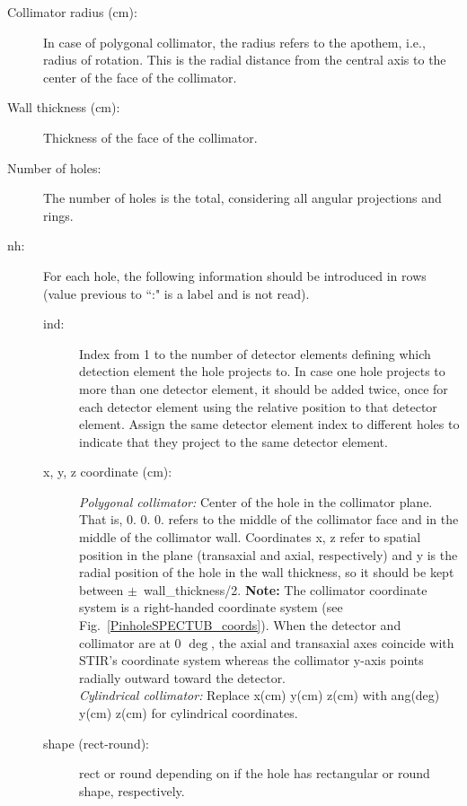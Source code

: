 \documentclass{article}
\begin{document}
{{{{{{\begin{description}
\item[Collimator radius (cm):] In case of polygonal collimator, the radius refers to the apothem, i.e., radius of rotation. This is the radial distance from the central axis to the center of the face of the collimator.

\item[Wall thickness (cm):] Thickness of the face of the collimator.

\item[Number of holes:] The number of holes is the total, considering all angular projections and rings. 

\item[nh:] For each hole, the following information should be introduced in rows (value previous to ``:" is a label and is not read).

\begin{description}

\item[ind:] Index from 1 to the number of detector elements defining which detection element the hole projects to. In case one hole projects to more than one detector element, it should be added twice, once for each detector element using the relative position to that detector element. Assign the same detector element index to different holes to indicate that they project to the same detector element.

\item[x, y, z coordinate (cm):] \textit{Polygonal collimator:} Center of the hole in the collimator plane. That is, 0. 0. 0. refers to the middle of the collimator face and in the middle of the collimator wall. Coordinates x, z refer to spatial position in the plane (transaxial and axial, respectively) and y is the radial position of the hole in the wall thickness, so it should be kept between $\pm$~wall\_thickness/2. \textbf{Note:} The collimator coordinate system is a right-handed coordinate system (see Fig.~\ref{PinholeSPECTUB_coords}). When the detector and collimator are at 0 $\mathrm{\deg}$, the axial and transaxial axes coincide with STIR's coordinate system whereas the collimator y-axis points radially outward toward the detector. \\ \textit{Cylindrical collimator:} Replace x(cm) y(cm) z(cm) with ang(deg) y(cm) z(cm) for cylindrical coordinates. 

\item[shape (rect-round):] rect or round depending on if the hole has rectangular or round shape, respectively.


\end{description}
\end{description}}}}}}}
\end{document}
